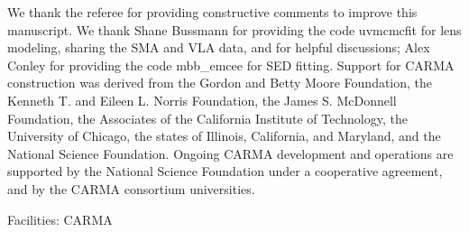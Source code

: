 \documentclass[iop, revtex4]{emulateapj}
\begin{document}
\begin{acknowledgments}
We thank the referee for providing constructive comments to improve this manuscript.
We thank Shane Bussmann for providing the code {\sc uvmcmcfit} for lens modeling, sharing the SMA and VLA data, and for helpful discussions; Alex Conley for providing the code {\sc mbb\_emcee} for SED fitting. 
Support for CARMA construction was derived from the
Gordon and Betty Moore Foundation, the Kenneth T. and Eileen
L. Norris Foundation, the James S. McDonnell Foundation, the
Associates of the California Institute of Technology, the University
of Chicago, the states of Illinois, California, and Maryland,
and the National Science Foundation. 
Ongoing CARMA development
and operations are supported by the National Science
Foundation under a cooperative agreement, and by the CARMA
consortium universities.

Facilities: CARMA
\end{acknowledgments}


%
%
\end{document}
